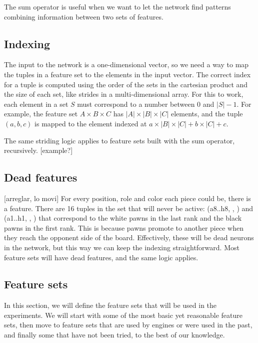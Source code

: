 The sum operator is useful when we want to let the network find patterns combining information between two sets of features.



\subsection{Indexing}

The input to the network is a one-dimensional vector, so we need a way to map the tuples in a feature set to the elements in the input vector. The correct index for a tuple is computed using the order of the sets in the cartesian product and the size of each set, like strides in a multi-dimensional array. For this to work, each element in a set $S$ must correspond to a number between $0$ and $|S| - 1$. For example, the feature set $A \times B \times C$ has $|A| \times |B| \times |C|$ elements, and the tuple $(a, b, c)$ is mapped to the element indexed at $a \times |B| \times |C| + b \times |C| + c$.

The same striding logic applies to feature sets built with the sum operator, recursively. [example?]

\subsection{Dead features}

[arreglar, lo movi]
For every position, role and color each piece could be, there is a feature. There are 16 tuples in the set that will never be active: (a8..h8, \sympawn, \white) and (a1..h1, \sympawn, \black) that correspond to the white pawns in the last rank and the black pawns in the first rank. This is because pawns promote to another piece when they reach the opponent side of the board. Effectively, these will be dead neurons in the network, but this way we can keep the indexing straightforward. Most feature sets will have dead features, and the same logic applies.


\subsection{Feature sets}

In this section, we will define the feature sets that will be used in the experiments. We will start with some of the most basic yet reasonable feature sets, then move to feature sets that are used by engines or were used in the past, and finally some that have not been tried, to the best of our knowledge.

